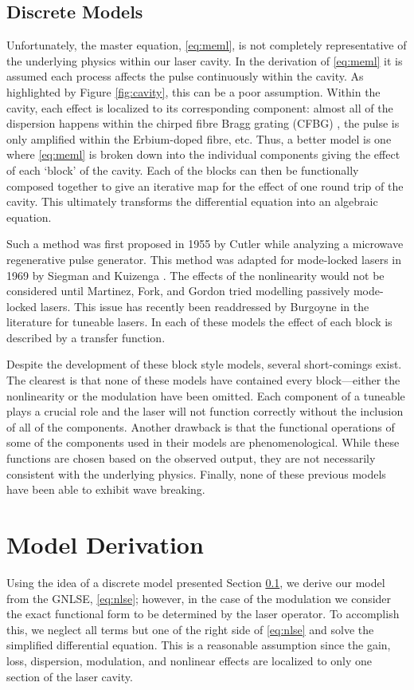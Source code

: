 \documentclass[10pt,twocolumn,a4paper]{article}
\begin{document}
\subsection{Discrete Models}
\label{sec:discrete}
Unfortunately, the master equation, \eqref{eq:meml}, is not completely representative of the underlying physics within our laser cavity. In the derivation of \eqref{eq:meml} it is assumed each process affects the pulse continuously within the cavity. As highlighted by Figure \ref{fig:cavity}, this can be a poor assumption. Within the cavity, each effect is localized to its corresponding component: almost all of the dispersion happens within the chirped fibre Bragg grating (CFBG) \cite{agrawal2002}, the pulse is only amplified within the Erbium-doped fibre, etc. Thus, a better model is one where \eqref{eq:meml} is broken down into the individual components giving the effect of each `block' of the cavity. Each of the blocks can then be functionally composed together to give an iterative map for the effect of one round trip of the cavity. This ultimately transforms the differential equation into an algebraic equation.

Such a method was first proposed in 1955 by Cutler \cite{cutler1955} while analyzing a microwave regenerative pulse generator. This method was adapted for mode-locked lasers in 1969 by Siegman and Kuizenga \cite{kuizenga1970a, kuizenga1970b, kuizenga1970, siegman1969}. The effects of the nonlinearity would not be considered until Martinez, Fork, and Gordon \cite{martinez1984, martinez1985} tried modelling passively mode-locked lasers. This issue has recently been readdressed by Burgoyne \cite{burgoyne2014} in the literature for tuneable lasers. In each of these models the effect of each block is described by a transfer function.

Despite the development of these block style models, several short-comings exist. The clearest is that none of these models have contained every block---either the nonlinearity or the modulation have been omitted. Each component of a tuneable plays a crucial role and the laser will not function correctly without the inclusion of all of the components. Another drawback is that the functional operations of some of the components used in their models are phenomenological. While these functions are chosen based on the observed output, they are not necessarily consistent with the underlying physics. Finally, none of these previous models have been able to exhibit wave breaking.


\section{Model Derivation}
\label{sec:model}
Using the idea of a discrete model presented Section \ref{sec:discrete}, we derive our model from the GNLSE, \eqref{eq:nlse}; however, in the case of the modulation we consider the exact functional form to be determined by the laser operator. To accomplish this, we neglect all terms but one of the right side of \eqref{eq:nlse} and solve the simplified differential equation. This is a reasonable assumption since the gain, loss, dispersion, modulation, and nonlinear effects are localized to only one section of the laser cavity.
\end{document}
